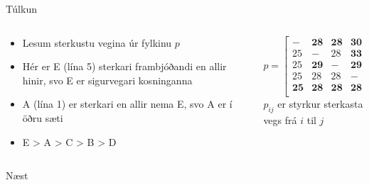 \documentclass{beamer}
\begin{document}
\begin{frame}{Túlkun}
	\begin{columns}
		\begin{column}{0.5\textwidth}
			\begin{itemize}
				\item Lesum sterkustu vegina úr fylkinu $p$
				\item Hér er E (lína 5) sterkari frambjóðandi en allir hinir, svo E er sigurvegari kosninganna
				\item A (lína 1) er sterkari en allir nema E, svo A er í öðru sæti
				\item E > A > C > B > D
			\end{itemize}
		\end{column}
		\begin{column}{0.5\textwidth}
			\[ 
				p =
				\begin{bmatrix}
					-  & \mathbf{28} & \mathbf{28} & \mathbf{30} & 24 \\
					25 & -  & 28 & \mathbf{33} & 24 \\
					25 & \mathbf{29} & -  & \mathbf{29} & 24 \\
					25 & 28 & 28 & -  & 24 \\
					\mathbf{25} & \mathbf{28} & \mathbf{28} & \mathbf{28} & -  \\
				\end{bmatrix}
			\]
			$p_{ij}$ er styrkur sterkasta vegs frá $i$ til $j$
		\end{column}
	\end{columns}
\end{frame}

\begin{frame}{Næst}

\end{frame}
\end{document}
